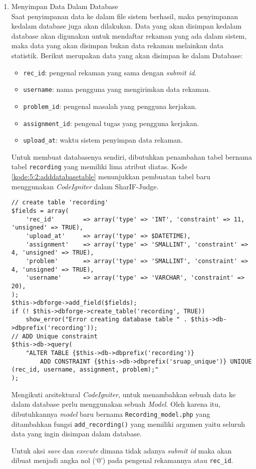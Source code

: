\begin{enumerate}
    \item Menyimpan Data Dalam Database \\
    Saat penyimpanan data ke dalam file sistem berhasil, maka penyimpanan kedalam database juga akan dilakukan. Data yang akan disimpan kedalam database akan digunakan untuk mendaftar rekaman yang ada dalam sistem, maka data yang akan disimpan bukan data rekaman melainkan data statistik. Berikut merupakan data yang akan disimpan ke dalam Database:
    \begin{itemize}
        \item \verb|rec_id|: pengenal rekaman yang sama dengan \textit{submit id}.  
        \item \verb|username|: nama pengguna yang mengirimkan data rekaman.
        \item \verb|problem_id|: pengenal masalah yang pengguna kerjakan.
        \item \verb|assignment_id|: pengenal tugas yang pengguna kerjakan.
        \item \verb|upload_at|: waktu sistem penyimpan data rekaman.
    \end{itemize}
    Untuk membuat databasenya sendiri, dibutuhkan penambahan tabel bernama tabel \verb|recording| yang memiliki lima atribut diatas. Kode \ref{kode:5:2:adddatabasetable} menunjukkan pembuatan tabel baru menggunakan \textit{CodeIgniter} dalam SharIF-Judge.

    \begin{lstlisting}[caption={Kode membuat database pada SharIF-Judge}, label={kode:5:2:adddatabasetable}]
// create table 'recording'
$fields = array(
    'rec_id' 	    => array('type' => 'INT', 'constraint' => 11, 'unsigned' => TRUE),	
    'upload_at'		=> array('type' => $DATETIME),
    'assignment' 	=> array('type' => 'SMALLINT', 'constraint' => 4, 'unsigned' => TRUE),
    'problem'       => array('type' => 'SMALLINT', 'constraint' => 4, 'unsigned' => TRUE),
    'username'      => array('type' => 'VARCHAR', 'constraint' => 20),
);
$this->dbforge->add_field($fields);
if (! $this->dbforge->create_table('recording', TRUE))
    show_error("Error creating database table " . $this->db->dbprefix('recording'));
// ADD Unique constraint
$this->db->query(
    "ALTER TABLE {$this->db->dbprefix('recording')}
        ADD CONSTRAINT {$this->db->dbprefix('sruap_unique')} UNIQUE (rec_id, username, assignment, problem);"
);
    \end{lstlisting}

    Mengikuti arsitektural \textit{CodeIgniter}, untuk menambahkan sebuah data ke dalam database perlu menggunakan sebuah \textit{Model}. Oleh karena itu, dibutuhkannya \textit{model} baru bernama \verb|Recording_model.php| yang ditambahkan fungsi \verb|add_recording()| yang memiliki argumen yaitu seluruh data yang ingin disimpan dalam database.

    Untuk aksi \textit{save} dan \textit{execute} dimana tidak adanya \textit{submit id} maka akan dibuat menjadi angka nol (`0') pada pengenal rekamannya atau \verb|rec_id|.
\end{enumerate}

